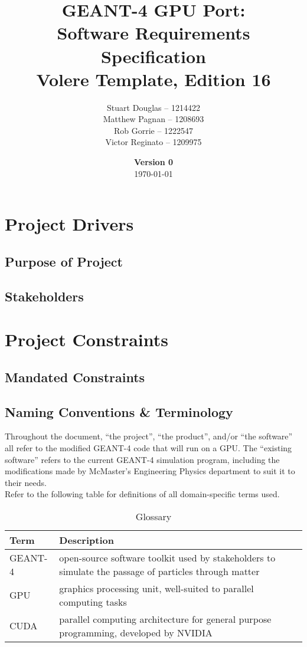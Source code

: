 \documentclass[12pt]{article}
\title{
	\LARGE GEANT-4 GPU Port:
	\\\vspace{10mm}
	\large \textbf{Software Requirements Specification}
	\\Volere Template, Edition 16
	\vspace{40mm}
}
\author{
	Stuart Douglas -- 1214422
	\\Matthew Pagnan -- 1208693
	\\Rob Gorrie -- 1222547
	\\Victor Reginato -- 1209975
	\vspace{10mm}
}
\date{\vfill \textbf{Version 0}\\ \today}
\begin{document}

\maketitle
\newpage


\tableofcontents
{}

\section{Project Drivers}
\subsection{Purpose of Project} %
\subsection{Stakeholders} %

\section{Project Constraints}
\subsection{Mandated Constraints} %

\subsection{Naming Conventions \& Terminology}
Throughout the document, ``the project'', ``the product'', and/or ``the software'' all refer to the modified GEANT-4 code that will run on a GPU. The ``existing software'' refers to the current GEANT-4 simulation program, including the modifications made by McMaster's Engineering Physics department to suit it to their needs.\\

Refer to the following table for definitions of all domain-specific terms used.\\

\begin{table}[h]
\centering
\begin{tabularx}{\textwidth}{lX}
\hline
Term & Description\\
\hline
GEANT-4 & open-source software toolkit used by stakeholders to simulate the passage of particles through matter\\
GPU & graphics processing unit, well-suited to parallel computing tasks\\
CUDA & parallel computing architecture for general purpose programming, developed by NVIDIA\\
\hline
\end{tabularx}
\caption{Glossary}
\end{table}
\end{document}
